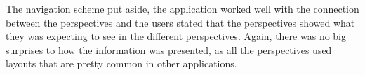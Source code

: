 The navigation scheme put aside, the application worked well with the connection between the perspectives and the users stated that the perspectives showed what they was expecting to see in the different perspectives. Again, there was no big surprises to how the information was presented, as all the perspectives used layouts that are pretty common in other applications.









